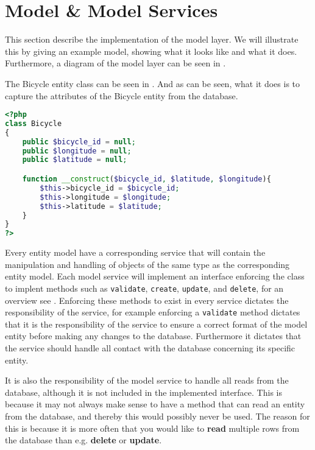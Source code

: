 \section{Model \& Model Services}
This section describe the implementation of the model layer. 
We will illustrate this by giving an example model, showing what it looks like and what it does.
Furthermore, a diagram of the model layer can be seen in .

The Bicycle entity class can be seen in .
And as can be seen, what it does is to capture the attributes of the Bicycle entity from the database.

\begin{minipage}{\textwidth}
\begin{lstlisting}[language=php, label=lst:bicycleModel, caption={Bicycle Class}]
<?php
class Bicycle
{
    public $bicycle_id = null;
    public $longitude = null;
    public $latitude = null;

    function __construct($bicycle_id, $latitude, $longitude){
        $this->bicycle_id = $bicycle_id;
        $this->longitude = $longitude;
        $this->latitude = $latitude;
    }
}
?>
\end{lstlisting}
\end{minipage}

Every entity model have a corresponding service that will contain the manipulation and handling of objects of the same type as the corresponding entity model. 
Each model service will implement an interface enforcing the class to implent methods such as \texttt{validate}, \texttt{create}, \texttt{update}, and \texttt{delete}, for an overview see . 
Enforcing these methods to exist in every service dictates the responsibility of the service, for example enforcing a \texttt{validate} method dictates that it is the responsibility of the service to ensure a correct format of the model entity before making any changes to the database. 
Furthermore it dictates that the service should handle all contact with the database concerning its specific entity.

It is also the responsibility of the model service to handle all reads from the database, although it is not included in the implemented interface.
This is because it may not always make sense to have a method that can read an entity from the database, and thereby this would possibly never be used.
The reason for this is because it is more often that you would like to \textbf{read} multiple rows from the database than e.g. \textbf{delete} or \textbf{update}.

